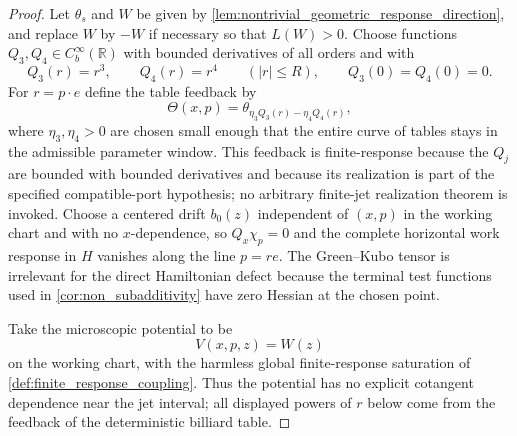 \documentclass[12pt, letterpaper]{amsart}
\newcommand{\R}{\mathbb{R}}
\theoremstyle{plain}
\theoremstyle{definition}
\theoremstyle{remark}
\begin{document}
\begin{proof}
Let $\theta_s$ and $W$ be given by
\cref{lem:nontrivial_geometric_response_direction}, and replace $W$ by $-W$ if
necessary so that $L(W)>0$.  Choose functions
$Q_3,Q_4\in C_b^\infty(\R)$ with bounded derivatives of all orders and with
\begin{equation}
    Q_3(r)=r^3,
    \qquad
    Q_4(r)=r^4
    \qquad (|r|\le R),
    \qquad
    Q_3(0)=Q_4(0)=0 .
\end{equation}
For $r=p\cdot e$ define the table feedback by
\begin{equation}
\label{eq:odd_even_response_feedback_curve}
    \Theta(x,p)=\theta_{\eta_3Q_3(r)-\eta_4Q_4(r)},
\end{equation}
where $\eta_3,\eta_4>0$ are chosen small enough that the entire curve of tables
stays in the admissible parameter window. This feedback is finite-response
because the $Q_j$ are bounded with bounded derivatives and because its
realization is part of the specified compatible-port hypothesis; no arbitrary
finite-jet realization theorem is invoked.
Choose a centered drift $b_0(z)$ independent of $(x,p)$ in the working chart and
with no $x$-dependence, so $Q_x\chi_p=0$ and the complete horizontal work response in $H$ vanishes
along the line $p=re$.  The Green--Kubo tensor is irrelevant for the direct
Hamiltonian defect because the terminal test functions used in
\cref{cor:non_subadditivity} have zero Hessian at the chosen point.

Take the microscopic potential to be
\begin{equation}
\label{eq:odd_even_nonconvex_potential}
    V(x,p,z)=W(z)
\end{equation}
on the working chart, with the harmless global finite-response saturation of
\cref{def:finite_response_coupling}.  Thus the potential has no explicit
cotangent dependence near the jet interval; all displayed powers of $r$ below
come from the feedback of the deterministic billiard table.


\end{proof}
\end{document}
